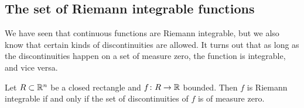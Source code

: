 \subsection{The set of Riemann integrable functions}

We have seen that continuous functions are Riemann integrable, but we also
know that certain kinds of discontinuities are allowed.
It turns out that as long as the discontinuities happen on a set of measure
zero, the function is integrable, and vice versa.

\begin{thm}%
%
%
Let $R \subset {\mathbb{R}}^n$ be a closed rectangle and $f \colon R \to {\mathbb{R}}$
bounded.  Then $f$ is Riemann integrable if and only if
the set of discontinuities of $f$ is of measure zero.
\end{thm}

